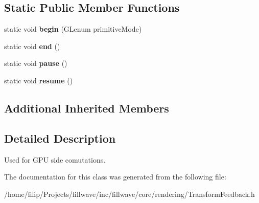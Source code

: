 \subsection*{Static Public Member Functions}
\begin{DoxyCompactItemize}
\item 
static void {\bfseries begin} (G\+Lenum primitive\+Mode)\hypertarget{classflw_1_1flc_1_1TransformFeedback_a5ed5f1b7c44ae0021917762769c2c208}{}\label{classflw_1_1flc_1_1TransformFeedback_a5ed5f1b7c44ae0021917762769c2c208}

\item 
static void {\bfseries end} ()\hypertarget{classflw_1_1flc_1_1TransformFeedback_aa1b77fac24fcb1c506e1e6d2bcd51de8}{}\label{classflw_1_1flc_1_1TransformFeedback_aa1b77fac24fcb1c506e1e6d2bcd51de8}

\item 
static void {\bfseries pause} ()\hypertarget{classflw_1_1flc_1_1TransformFeedback_a68b060b7cd41aeb3d05b16e529b0c2fe}{}\label{classflw_1_1flc_1_1TransformFeedback_a68b060b7cd41aeb3d05b16e529b0c2fe}

\item 
static void {\bfseries resume} ()\hypertarget{classflw_1_1flc_1_1TransformFeedback_a82ca365b8b8b1bed76029171f7718c88}{}\label{classflw_1_1flc_1_1TransformFeedback_a82ca365b8b8b1bed76029171f7718c88}

\end{DoxyCompactItemize}
\subsection*{Additional Inherited Members}


\subsection{Detailed Description}
Used for G\+PU side comutations. 

The documentation for this class was generated from the following file\+:\begin{DoxyCompactItemize}
\item 
/home/filip/\+Projects/fillwave/inc/fillwave/core/rendering/Transform\+Feedback.\+h\end{DoxyCompactItemize}

